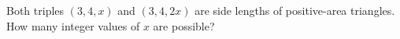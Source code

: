 Both triples $(3,4,x)$ and $(3,4,2x)$ are side lengths of positive-area triangles. How many integer values of $x$ are possible?
